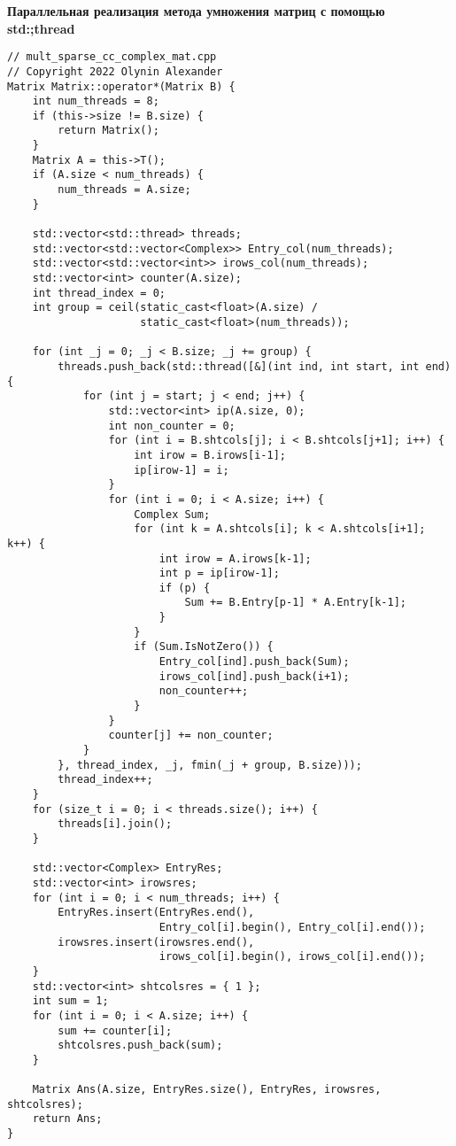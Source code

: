 \documentclass{report}
\begin{document}
\textbf{Параллельная реализация метода умножения матриц с помощью std:;thread}
\begin{lstlisting}
// mult_sparse_cc_complex_mat.cpp
// Copyright 2022 Olynin Alexander
Matrix Matrix::operator*(Matrix B) {
    int num_threads = 8;
    if (this->size != B.size) {
        return Matrix();
    }
    Matrix A = this->T();
    if (A.size < num_threads) {
        num_threads = A.size;
    }

    std::vector<std::thread> threads;
    std::vector<std::vector<Complex>> Entry_col(num_threads);
    std::vector<std::vector<int>> irows_col(num_threads);
    std::vector<int> counter(A.size);
    int thread_index = 0;
    int group = ceil(static_cast<float>(A.size) /
                     static_cast<float>(num_threads));

    for (int _j = 0; _j < B.size; _j += group) {
        threads.push_back(std::thread([&](int ind, int start, int end) {
            for (int j = start; j < end; j++) {
                std::vector<int> ip(A.size, 0);
                int non_counter = 0;
                for (int i = B.shtcols[j]; i < B.shtcols[j+1]; i++) {
                    int irow = B.irows[i-1];
                    ip[irow-1] = i;
                }
                for (int i = 0; i < A.size; i++) {
                    Complex Sum;
                    for (int k = A.shtcols[i]; k < A.shtcols[i+1]; k++) {
                        int irow = A.irows[k-1];
                        int p = ip[irow-1];
                        if (p) {
                            Sum += B.Entry[p-1] * A.Entry[k-1];
                        }
                    }
                    if (Sum.IsNotZero()) {
                        Entry_col[ind].push_back(Sum);
                        irows_col[ind].push_back(i+1);
                        non_counter++;
                    }
                }
                counter[j] += non_counter;
            }
        }, thread_index, _j, fmin(_j + group, B.size)));
        thread_index++;
    }
    for (size_t i = 0; i < threads.size(); i++) {
        threads[i].join();
    }

    std::vector<Complex> EntryRes;
    std::vector<int> irowsres;
    for (int i = 0; i < num_threads; i++) {
        EntryRes.insert(EntryRes.end(),
                        Entry_col[i].begin(), Entry_col[i].end());
        irowsres.insert(irowsres.end(),
                        irows_col[i].begin(), irows_col[i].end());
    }
    std::vector<int> shtcolsres = { 1 };
    int sum = 1;
    for (int i = 0; i < A.size; i++) {
        sum += counter[i];
        shtcolsres.push_back(sum);
    }

    Matrix Ans(A.size, EntryRes.size(), EntryRes, irowsres, shtcolsres);
    return Ans;
}
\end{lstlisting}
\end{document}
